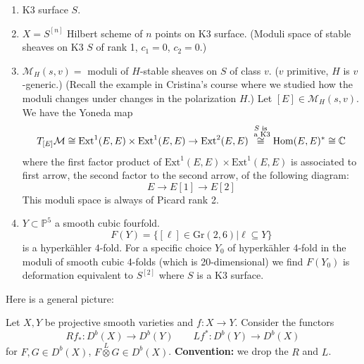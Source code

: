 \begin{example}
\label{example-hyperkahler}
\begin{enumerate}
\item K3 surface $S$.
\item $X=S^{[n]}$ Hilbert scheme of $n$
points on K3 surface. (Moduli space of
stable sheaves on K3 $S$ of rank 1,  $c_1=0$,
$c_2=0$.)
\item $\mathcal{M}_H(s,v)=$ moduli of
$H$-stable sheaves on $S$ of class $v$.
($v$ primitive, $H$ is $v$-generic.) (Recall
the example in Cristina's course where we
studied how the moduli changes under changes
in the polarization $H$.) Let $[E] \in
\mathcal{M}_H(s,v)$. We have the Yoneda map
$$
T_{[E]}\mathcal{M}\cong
\text{Ext}^1(E,E)\times \text{Ext}^1(E,E)
\to \text{Ext}^2(E,E)\overset{\substack{S
\text{ is}\\\text{ a
K3}}}{\cong}\mathop{\mathrm{Hom}}\nolimits(E,E)^*\cong \mathbb{C}
$$
where the first factor product of
$\text{Ext}^1(E,E)\times \text{Ext}^1(E,E)$
is associated to first arrow, the second
factor to the second arrow, of the following
diagram:
$$
E \to E[1] \to E[2]
$$
This moduli space is always of Picard rank 2.
\item $Y \subset \mathbb{P}^5$ a smooth cubic
fourfold.
$$
F(Y)=\{[\ell] \in \text{Gr}(2,6)|\ell
\subseteq Y\}
$$
is a hyperk\"ahler 4-fold. For a specific
choice $Y_0$ of hyperk\"ahler 4-fold in the
moduli of smooth cubic 4-folds (which is
20-dimensional) we find $F(Y_0)$ is
deformation equivalent to $S^{[2]}$ where $S$
is a K3 surface.
\end{enumerate}
\end{example}

\medskip\noindent
Here is a general picture:

\medskip\noindent
Let $X,Y$ be projective smooth varieties and
$f:X\to Y$. Consider the functors
$$
Rf_*:D^b(X) \to D^b(Y)\qquad Lf^*:D^b(Y) \to
D^b(X)
$$
for $F,G \in D^b(X)$, $F\overset{L}{\otimes}G
\in D^b(X)$. {\bf Convention:} we drop the
$R$ and $L$.

